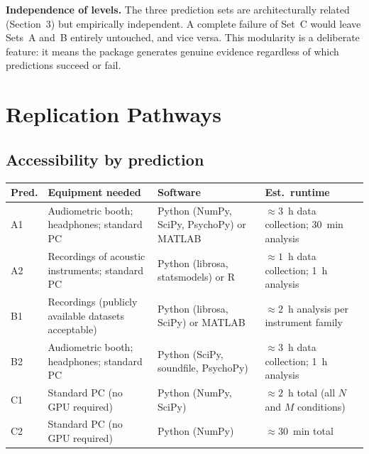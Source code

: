 \documentclass[11pt, a4paper]{article}
\begin{document}
\begin{notebox}
\textbf{Independence of levels.}  The three prediction sets are architecturally
related (Section~3) but empirically independent.  A complete failure of Set~C
would leave Sets~A and~B entirely untouched, and vice versa.  This modularity
is a deliberate feature: it means the package generates genuine evidence regardless
of which predictions succeed or fail.
\end{notebox}

\section{Replication Pathways}

\subsection{Accessibility by prediction}

\noindent\begin{minipage}{\textwidth}
\centering
\renewcommand{\arraystretch}{1.4}
\begin{tabular}{p{1.0cm} p{2.8cm} p{3.5cm} p{4.2cm}}
\toprule
\textbf{Pred.} & \textbf{Equipment needed} & \textbf{Software} & \textbf{Est.\ runtime} \\
\midrule
A1  & Audiometric booth; headphones; standard PC &
      Python (NumPy, SciPy, PsychoPy) or MATLAB &
      $\approx 3$~h data collection; 30~min analysis \\
A2  & Recordings of acoustic instruments; standard PC &
      Python (librosa, statsmodels) or R &
      $\approx 1$~h data collection; 1~h analysis \\
B1  & Recordings (publicly available datasets acceptable) &
      Python (librosa, SciPy) or MATLAB &
      $\approx 2$~h analysis per instrument family \\
B2  & Audiometric booth; headphones; standard PC &
      Python (SciPy, soundfile, PsychoPy) &
      $\approx 3$~h data collection; 1~h analysis \\
C1  & Standard PC (no GPU required) &
      Python (NumPy, SciPy) &
      $\approx 2$~h total (all $N$ and $M$ conditions) \\
C2  & Standard PC (no GPU required) &
      Python (NumPy) &
      $\approx 30$~min total \\
\bottomrule
\end{tabular}
\end{minipage}
\end{document}
